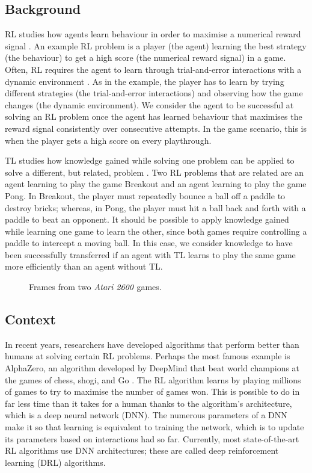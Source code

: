 \documentclass[12pt,a4paper]{article}
\begin{document}
\subsection{Background} 
RL studies how agents learn behaviour in order to maximise a numerical reward signal \cite{sutton2018reinforcement}. An example RL problem is a player (the agent) learning the best strategy (the behaviour) to get a high score (the numerical reward signal) in a game. Often, RL requires the agent to learn through trial-and-error interactions with a dynamic environment \cite{Kaelbling1996}. As in the example, the player has to learn by trying different strategies (the trial-and-error interactions) and observing how the game changes (the dynamic environment). We consider the agent to be successful at solving an RL problem once the agent has learned behaviour that maximises the reward signal consistently over consecutive attempts. In the game scenario, this is when the player gets a high score on every playthrough. 

TL studies how knowledge gained while solving one problem can be applied to solve a different, but related, problem \cite{2010}. Two RL problems that are related are an agent learning to play the game Breakout and an agent learning to play the game Pong. In Breakout, the player must repeatedly bounce a ball off a paddle to destroy bricks; whereas, in Pong, the player must hit a ball back and forth with a paddle to beat an opponent. It should be possible to apply knowledge gained while learning one game to learn the other, since both games require controlling a paddle to intercept a moving ball. In this case, we consider knowledge to have been successfully transferred if an agent with TL learns to play the same game more efficiently than an agent without TL.

\begin{figure}[ht]
    \centering
    \hfill
    \caption{Frames from two $\emph{Atari 2600}$ games.}
    \label{fig:frames}
\end{figure}

\subsection{Context}
In recent years, researchers have developed algorithms that perform better than humans at solving certain RL problems. Perhaps the most famous example is AlphaZero, an algorithm developed by DeepMind that beat world champions at the games of chess, shogi, and Go \cite{Silver1140}. The RL algorithm learns by playing millions of games to try to maximise the number of games won. This is possible to do in far less time than it takes for a human thanks to the algorithm's architecture, which is a deep neural network (DNN). The numerous parameters of a DNN make it so that learning is equivalent to training the network, which is to update its parameters based on interactions had so far. Currently, most state-of-the-art RL algorithms use DNN architectures; these are called deep reinforcement learning (DRL) algorithms.
\end{document}
